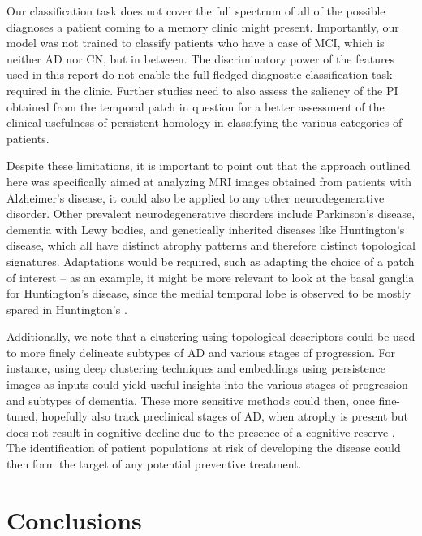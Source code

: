 \documentclass{article}
\begin{document}
Our classification task does not cover the full spectrum of all of the possible diagnoses a patient
coming to a memory clinic might present. Importantly, our model was not trained to classify patients
who have a case of MCI, which is neither AD nor CN, but in between. The
discriminatory power of the features used in this report do not enable the full-fledged
diagnostic classification task required in the clinic. Further studies need to also assess the
saliency of the PI obtained from the temporal patch in question for a better assessment of the
clinical usefulness of persistent homology in classifying the various categories of patients.

Despite these limitations, it is important to point out that the approach outlined here was
specifically aimed at analyzing MRI images obtained from patients with Alzheimer's disease, it could
also be applied to any other neurodegenerative disorder. Other prevalent neurodegenerative disorders
include Parkinson's disease, dementia with Lewy bodies, and genetically inherited diseases like
Huntington's disease, which all have distinct atrophy patterns and therefore distinct topological signatures.
Adaptations would be required, such as adapting the choice of a patch of interest -- as an example, it
might be more relevant to look at the basal ganglia for Huntington's disease, since the medial
temporal lobe is observed to be mostly spared in Huntington's
\citep{kuhl1982cerebral, halliday1998regional, kassubek2004topography}.

Additionally, we note that a clustering using topological descriptors could be used to more finely
delineate subtypes of AD and various stages of progression. For instance, using deep clustering
techniques and embeddings using persistence images as inputs could yield useful insights into the
various stages of progression and subtypes of dementia. These more sensitive methods could then,
once fine-tuned, hopefully also track preclinical stages of AD, when atrophy is present but does not
result in cognitive decline due to the presence of a cognitive reserve
\citep{scarmeas2004cognitive, van2017neuroimaging}. The identification of patient populations at
risk of developing the disease could then form the target of any potential preventive treatment.

\section{Conclusions}
\end{document}
